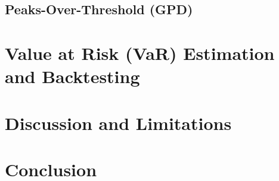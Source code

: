 \documentclass[12pt, a4paper]{article}
\begin{document}
\subsection{Peaks-Over-Threshold (GPD)}

\section{Value at Risk (VaR) Estimation and Backtesting}

\section{Discussion and Limitations}

\section{Conclusion}



\end{document}
